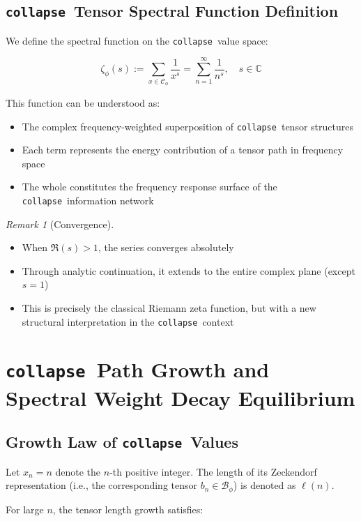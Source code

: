 \documentclass[12pt,a4paper]{article}
\theoremstyle{plain}
\theoremstyle{definition}
\theoremstyle{remark}
\newtheorem{remark}[theorem]{Remark}
\newcommand{\collapse}{\texttt{collapse}}
\newcommand{\Bphi}{\mathcal{B}_\phi}
\newcommand{\Cphi}{\mathcal{C}_\phi}
\newcommand{\C}{\mathbb{C}}
\begin{document}
\subsection{\collapse\ Tensor Spectral Function Definition}

We define the spectral function on the \collapse\ value space:

\begin{equation}
\zeta_\phi(s) := \sum_{x \in \Cphi} \frac{1}{x^s} = \sum_{n=1}^{\infty} \frac{1}{n^s}, \quad s \in \C
\end{equation}

This function can be understood as:
\begin{itemize}
\item The complex frequency-weighted superposition of \collapse\ tensor structures
\item Each term represents the energy contribution of a tensor path in frequency space
\item The whole constitutes the frequency response surface of the \collapse\ information network
\end{itemize}

\begin{remark}[Convergence]
\begin{itemize}
\item When $\Re(s) > 1$, the series converges absolutely
\item Through analytic continuation, it extends to the entire complex plane (except $s = 1$)
\item This is precisely the classical Riemann zeta function, but with a new structural interpretation in the \collapse\ context
\end{itemize}
\end{remark}

\section{\collapse\ Path Growth and Spectral Weight Decay Equilibrium}

\subsection{Growth Law of \collapse\ Values}

Let $x_n = n$ denote the $n$-th positive integer. The length of its Zeckendorf representation (i.e., the corresponding tensor $b_n \in \Bphi$) is denoted as $\ell(n)$.

For large $n$, the tensor length growth satisfies:
\end{document}
